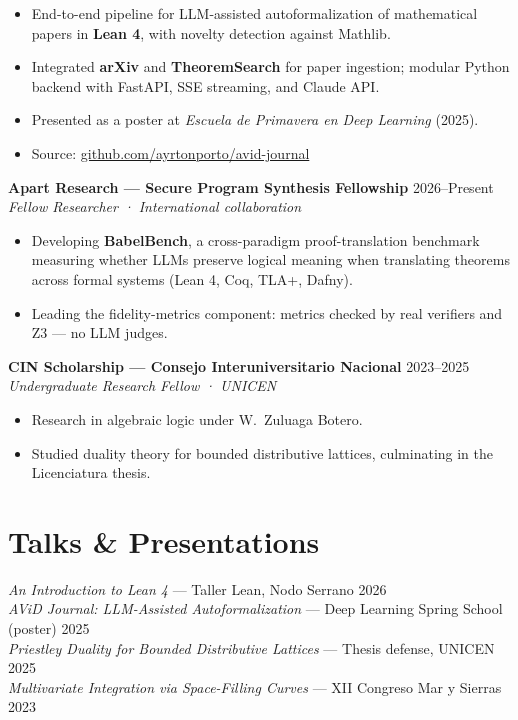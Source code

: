 \documentclass[11pt,a4paper]{article}
\begin{document}
\begin{itemize}
  \item End-to-end pipeline for LLM-assisted autoformalization of mathematical papers in \textbf{Lean 4}, with novelty detection against Mathlib.
  \item Integrated \textbf{arXiv} and \textbf{TheoremSearch} for paper ingestion; modular Python backend with FastAPI, SSE streaming, and Claude API.
  \item Presented as a poster at \textit{Escuela de Primavera en Deep Learning} (2025).
  \item Source: \href{https://github.com/ayrtonporto/avid-journal}{github.com/ayrtonporto/avid-journal}
\end{itemize}

\vspace{0.3em}
\textbf{Apart Research --- Secure Program Synthesis Fellowship} \hfill 2026--Present\\
\textit{Fellow Researcher · International collaboration}

\begin{itemize}
  \item Developing \textbf{BabelBench}, a cross-paradigm proof-translation benchmark measuring whether LLMs preserve logical meaning when translating theorems across formal systems (Lean 4, Coq, TLA+, Dafny).
  \item Leading the fidelity-metrics component: metrics checked by real verifiers and Z3 --- no LLM judges.
\end{itemize}

\vspace{0.3em}
\textbf{CIN Scholarship --- Consejo Interuniversitario Nacional} \hfill 2023--2025\\
\textit{Undergraduate Research Fellow · UNICEN}

\begin{itemize}
  \item Research in algebraic logic under W.\ Zuluaga Botero.
  \item Studied duality theory for bounded distributive lattices, culminating in the Licenciatura thesis.
\end{itemize}

\section{Talks \& Presentations}

\textit{An Introduction to Lean 4} --- Taller Lean, Nodo Serrano \hfill 2026\\
\textit{AViD Journal: LLM-Assisted Autoformalization} --- Deep Learning Spring School (poster) \hfill 2025\\
\textit{Priestley Duality for Bounded Distributive Lattices} --- Thesis defense, UNICEN \hfill 2025\\
\textit{Multivariate Integration via Space-Filling Curves} --- XII Congreso Mar y Sierras \hfill 2023
\end{document}
